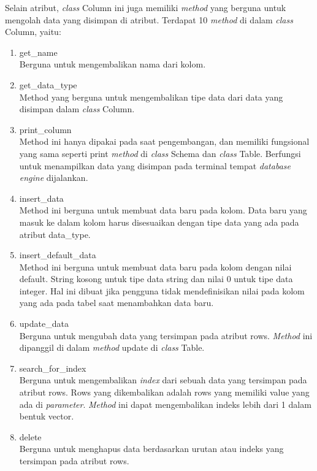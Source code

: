 Selain atribut, \emph{class} Column ini juga memiliki \emph{method} yang berguna untuk mengolah data yang disimpan di atribut. Terdapat 10 \emph{method} di dalam \emph{class} Column, yaitu:

\begin{enumerate}
	\item get\_name \\
	Berguna untuk mengembalikan nama dari kolom.

	\item get\_data\_type \\
	Method yang berguna untuk mengembalikan tipe data dari data yang disimpan dalam \emph{class} Column.

	\item print\_column \\
	Method ini hanya dipakai pada saat pengembangan, dan memiliki fungsional yang sama seperti print \emph{method} di \emph{class} Schema dan \emph{class} Table. Berfungsi untuk menampilkan
  data yang disimpan pada terminal tempat \emph{database engine} dijalankan.

	\item insert\_data \\
	Method ini berguna untuk membuat data baru pada kolom. Data baru yang masuk ke dalam kolom harus disesuaikan dengan tipe data yang ada pada atribut data\_type.

	\item insert\_default\_data \\
	Method ini berguna untuk membuat data baru pada kolom dengan nilai default. String kosong untuk tipe data string dan nilai 0 untuk tipe data integer. Hal ini dibuat
  jika pengguna tidak mendefinisikan nilai pada kolom yang ada pada tabel saat menambahkan data baru.
  
	\item update\_data \\
	Berguna untuk mengubah data yang tersimpan pada atribut rows. \emph{Method} ini dipanggil di dalam \emph{method} update di \emph{class} Table.
  
	\item search\_for\_index \\
	Berguna untuk mengembalikan \emph{index} dari sebuah data yang tersimpan pada atribut rows. Rows yang dikembalikan adalah rows yang memiliki value yang ada di \emph{parameter}.
  \emph{Method} ini dapat mengembalikan indeks lebih dari 1 dalam bentuk vector.
  
	\item delete \\
	Berguna untuk menghapus data berdasarkan urutan atau indeks yang tersimpan pada atribut rows.
  

\end{enumerate}
